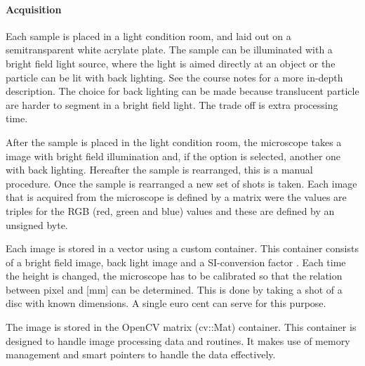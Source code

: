 \paragraph{Acquisition}  Each sample is placed in a light condition room, and laid out on a semitransparent white acrylate plate. The sample can be illuminated with a bright field light source, where the light is aimed directly at an object or the particle can be lit with back lighting. See the course notes \cite{ypma_course_2014} for a more in-depth description. The choice for back lighting can be made because translucent particle are harder to segment in a bright field light. The trade off is extra processing time.

After the sample is placed in the light condition room, the microscope takes a image with bright field illumination  and, if the option is selected, another one with back lighting.  Hereafter the sample is rearranged, this is a manual procedure. Once the sample is rearranged a new set of shots is taken. Each image that is acquired from the microscope is defined by a matrix were the values are triples for the RGB  (red, green and blue) values and these are defined by an unsigned byte. 

Each image is stored in a vector using a custom container. This container consists of a bright field image, back light image and a SI-conversion factor . Each time the height is changed, the microscope has to be calibrated so that the relation between pixel and [mm] can be determined. This is done by taking a shot of a disc with known dimensions. A single euro cent can serve for this purpose.

\begin{remark}
	The image is stored in the OpenCV matrix (cv::Mat) container. This container is  designed to handle image processing data and routines. It makes use of memory management and smart pointers to handle the data effectively. 
\end{remark}